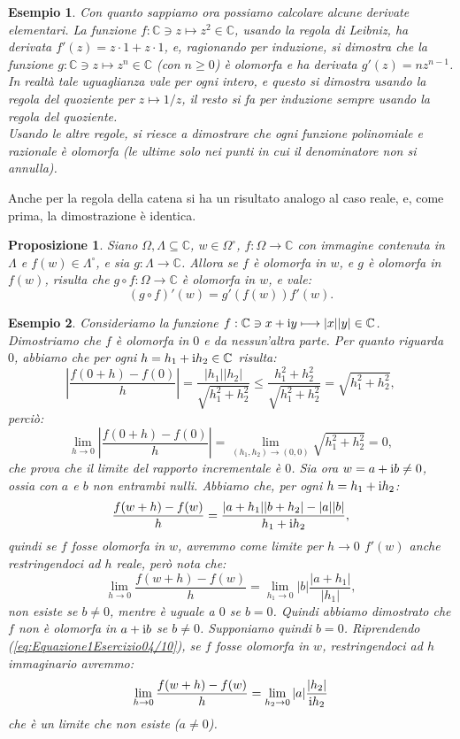 \documentclass[11pt]{book}
\theoremstyle{Definizione}
\theoremstyle{TeoremaProposizioneLemmaCorollarioCongettura}
\newtheorem{mypropo}[myteo]{Proposizione}
\theoremstyle{OsservazioneNotaEsempio}
\newtheorem{myes}{Esempio}[section]
\newcommand{\C}{\mathbb{C}}
\renewcommand{\i}{\textup{i}}
\begin{document}
\begin{myes}
Con quanto sappiamo ora possiamo calcolare alcune derivate elementari. La funzione $f:\C\ni z \longmapsto z^2\in \C$, usando la regola di Leibniz, ha derivata $f'(z) = z \cdot 1 + z \cdot 1$, e, ragionando per induzione, si dimostra che la funzione $g:\C \ni z \longmapsto z^n\in \C$ (con $n \geq 0$) è olomorfa e ha derivata $g'(z) = n z^{n-1}$.\\
In realtà tale uguaglianza vale per ogni intero, e questo si dimostra usando la regola del quoziente per $z \longmapsto 1/z$, il resto si fa per induzione sempre usando la regola del quoziente.\\
Usando le altre regole, si riesce a dimostrare che ogni funzione polinomiale e razionale è olomorfa (le ultime solo nei punti in cui il denominatore non si annulla). 
\end{myes}
Anche per la regola della catena si ha un risultato analogo al caso reale, e, come prima, la dimostrazione è identica.
\begin{boxpro}
\begin{mypropo}\label{pro:RegolaCatena}
Siano $\Omega,\Lambda\subseteq \C$, $w\in \Omega^\circ$, $f:\Omega\longrightarrow \C$ con immagine contenuta in $\Lambda$ e $f(w)\in \Lambda^\circ$, e sia $g: \Lambda \longrightarrow \C$. Allora se $f$ è olomorfa in $w$, e $g$ è olomorfa in $f(w)$, risulta che $g\circ f: \Omega \longrightarrow \C$ è olomorfa in $w$, e vale:
$$
(g\circ f)'(w) = g'(f(w))f'(w).
$$
\end{mypropo}
\end{boxpro}
\begin{myes}\label{es:Esercizio04/10}
Consideriamo la funzione $f:\C \ni x+\i y\longmapsto |x||y|\in \C$. Dimostriamo che $f$ è olomorfa in $0$ e da nessun'altra parte.
Per quanto riguarda $0$, abbiamo che per ogni $h = h_1+\i h_2\in \C$ risulta:
$$
\left|\frac{f(0+h)-f(0)}{h}\right| = \frac{|h_1||h_2|}{\sqrt{h_1^2+h_2^2}} \leq \frac{h_1^2+h_2^2}{\sqrt{h_1^2+h_2^2}} = \sqrt{h_1^2+h_2^2},
$$
perciò:
$$
\lim_{h \to 0} \left|\frac{f(0+h)-f(0)}{h}\right| = \lim_{(h_1,h_2)\to (0,0)} \sqrt{h_1^2+h_2^2} = 0,
$$
che prova che il limite del rapporto incrementale è $0$. 
Sia ora $w = a+\i b \neq 0$, ossia con $a$ e $b$ non entrambi nulli. Abbiamo che, per ogni $h = h_1+\i h_2$:
\begin{equation}\label{eq:Equazione1Esercizio04/10}
\frac{f(w+h)-f(w)}{h} = \frac{|a+h_1||b+h_2|-|a||b|}{h_1+\i h_2},
\end{equation}
quindi se $f$ fosse olomorfa in $w$, avremmo come limite per $h \to 0$ $f'(w)$ anche restringendoci ad $h$ reale, però nota che:
$$
\lim_{h \to 0} \frac{f(w+h)-f(w)}{h} = \lim_{h_1 \to 0} |b| \frac{|a+h_1|}{|h_1|},
$$
non esiste se $b \neq 0$, mentre è uguale a $0$ se $b = 0$. Quindi abbiamo dimostrato che $f$ non è olomorfa in $a+\i b$ se $b \neq 0$. Supponiamo quindi $b = 0$. Riprendendo (\ref{eq:Equazione1Esercizio04/10}), se $f$ fosse olomorfa in $w$, restringendoci ad $h$ immaginario avremmo:
$$
\lim_{h \to 0} \frac{f(w+h)-f(w)}{h} = \lim_{h_2 \to 0} |a|\frac{|h_2|}{\i h_2}
$$
che è un limite che non esiste ($a \neq 0$).
\end{myes}
\end{document}
